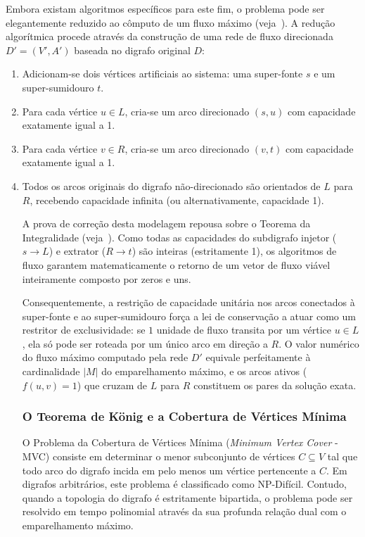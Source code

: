 \documentclass[12pt,a4paper]{article}
\begin{document}
Embora existam algoritmos específicos para este fim, o problema pode ser elegantemente reduzido ao cômputo de um fluxo máximo (veja~\cite{ahuja1993network}). A redução algorítmica procede através da construção de uma rede de fluxo direcionada $D' = (V', A')$ baseada no digrafo original $D$:
\begin{enumerate}
    \item Adicionam-se dois vértices artificiais ao sistema: uma super-fonte $s$ e um super-sumidouro $t$.
    \item Para cada vértice $u \in L$, cria-se um arco direcionado $(s, u)$ com capacidade exatamente igual a 1.
    \item Para cada vértice $v \in R$, cria-se um arco direcionado $(v, t)$ com capacidade exatamente igual a 1.
    \item Todos os arcos originais do digrafo não-direcionado são orientados de $L$ para $R$, recebendo capacidade infinita (ou alternativamente, capacidade 1).

A prova de correção desta modelagem repousa sobre o Teorema da Integralidade (veja~\cite{korte2018combinatorial}). Como todas as capacidades do subdigrafo injetor ($s \rightarrow L$) e extrator ($R \rightarrow t$) são inteiras (estritamente 1), os algoritmos de fluxo garantem matematicamente o retorno de um vetor de fluxo viável inteiramente composto por zeros e uns.

Consequentemente, a restrição de capacidade unitária nos arcos conectados à super-fonte e ao super-sumidouro força a lei de conservação a atuar como um restritor de exclusividade: se $1$ unidade de fluxo transita por um vértice $u \in L$, ela só pode ser roteada por um único arco em direção a $R$. O valor numérico do fluxo máximo computado pela rede $D'$ equivale perfeitamente à cardinalidade $|M|$ do emparelhamento máximo, e os arcos ativos ($f(u,v) = 1$) que cruzam de $L$ para $R$ constituem os pares da solução exata.

\subsubsection{O Teorema de König e a Cobertura de Vértices Mínima}

O Problema da Cobertura de Vértices Mínima (\textit{Minimum Vertex Cover} - MVC) consiste em determinar o menor subconjunto de vértices $C \subseteq V$ tal que todo arco do digrafo incida em pelo menos um vértice pertencente a $C$. Em digrafos arbitrários, este problema é classificado como NP-Difícil. Contudo, quando a topologia do digrafo é estritamente bipartida, o problema pode ser resolvido em tempo polinomial através da sua profunda relação dual com o emparelhamento máximo.


\end{enumerate}
\end{document}
